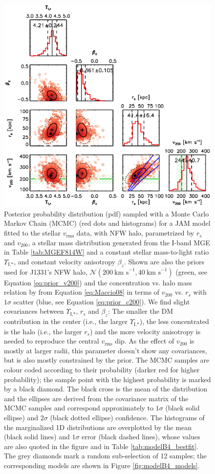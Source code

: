 \documentclass[useAMS,usenatbib]{mnras}
\begin{document}
\begin{figure}
\centering
\includegraphics[width=0.9\linewidth]{fig/B4_contour_plot_short.ps}
\caption{Posterior probability distribution (pdf) sampled with a Monte Carlo Markov Chain (MCMC) (red dots and histograms) for a JAM model fitted to the stellar $v_\text{rms}$ data, with NFW halo, parametrized by $r_s$ and $v_\text{200}$, a stellar mass distribution generated from the I-band MGE in Table \ref{tab:MGEF814W} and a constant stellar mass-to-light ratio $\Upsilon_\text{I,*}$, and constant velocity anisotropy $\beta_z$. Shown are also the priors used for J1331's NFW halo, $\mathscr{N}(200~\text{km s}^{-1},40~\text{km s}^{-1})$ (green, see Equation \eqref{eq:prior_v200}) and the concentration vs. halo mass relation by \citet{Maccio08} from Equation \eqref{eq:Maccio08} in terms of $v_{200}$ vs. $r_s$ with $1\sigma$ scatter (blue, see Equation \eqref{eq:prior_c200}). We find slight covariances between $\Upsilon_\text{I,*}$,  $r_s$ and $\beta_z$: The smaller the DM contribution in the center (i.e., the larger $\Upsilon_\text{I,*}$), the less concentrated is the halo (i.e., the larger $r_s$) and the more velocity anisotropy is needed to reproduce the central $v_\text{rms}$ dip. As the effect of $v_{200}$ is mostly at larger radii, this parameter doesn't show any covariances, but is also mostly constrained by the prior. The MCMC samples are colour coded according to their probability (darker red for higher probability); the sample point with the highest probability is marked by a black diamond. The black cross is the mean of the distribution and the ellipses are derived from the covariance matrix of the MCMC samples and correspond approximately to $1\sigma$ (black solid ellipse) and $2\sigma$ (black dotted ellipse) confidence. The histograms of the marginalized 1D distributions are overplotted by the mean (black solid lines) and $1\sigma$ error (black dashed lines), whose values are also quoted in the figure and in Table \ref{tab:modelB4_bestfit}. The grey diamonds mark a random sub-selection of 12 samples; the corresponding models are shown in Figure \ref{fig:modelB4_models}.}
\label{fig:modelB4_triangle}
\end{figure}
\end{document}
